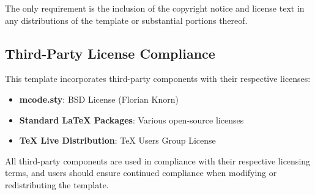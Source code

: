 The only requirement is the inclusion of the copyright notice and license text in any distributions of the template or substantial portions thereof.

\subsection{Third-Party License Compliance}
\label{subsec:third_party_licenses}

This template incorporates third-party components with their respective licenses:

\begin{itemize}
	\item \textbf{mcode.sty}: BSD License (Florian Knorn)
	\item \textbf{Standard LaTeX Packages}: Various open-source licenses
	\item \textbf{TeX Live Distribution}: TeX Users Group License
\end{itemize}

All third-party components are used in compliance with their respective licensing terms, and users should ensure continued compliance when modifying or redistributing the template.